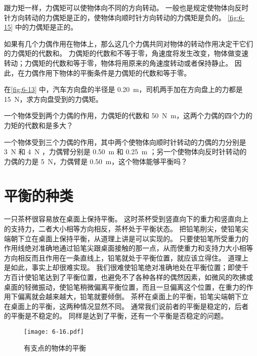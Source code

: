\medskip
跟力矩一样，力偶矩可以使物体向不同的方向转动。
一般也是规定使物体向反时针方向转动的力偶矩是正的，使物体向顺时针方向转动的力偶矩是负的。
\cref{fig:6-15} 中的力偶矩是正的。

如果有几个力偶作用在物体上，那么这几个力偶共同对物体的转动作用决定干它们的力偶矩的代数和。
力偶矩的代数和不等于零，角速度将发生改变，物体做变速转动；力偶矩的代数和等于零，物体将用原来的角速度转动或者保持静止。
因此，在力偶作用下物体的平衡条件是力偶矩的代数和等于零。

\begin{Practice}
\begin{question}
    \item 在\cref{fig:6-13} 中，汽车方向盘的半径是 \qty{0.20}{m}，司机两手加在方向盘上的力都是 \qty{15}{N}，求方向盘受到的力偶矩。
    \item 一个物体受到两个力偶的作用，力偶矩的代数和 \qty{50}{N.m}，这两个力偶的四个力的力矩的代数和是多大？
    \item 一个物体受到三个力偶的作用，其中两个使物体向顺时针转动的力偶的力分别是 \qty{3}{N} 和 \qty{4}{N} ，力偶臂分别是 \qty{0.50}{m} 和 \qty{0.25}{m} ；另一个使物体向反时针转动的力偶的力是 \qty{5}{N}，力偶臂是 \qty{0.50}{m}，这个物体能够平衡吗？
\end{question}
\end{Practice}

\section{平衡的种类}
一只茶杯很容易放在桌面上保持平衡。
这时茶杯受到竖直向下的重力和竖直向上的支持力，二者大小相等方向相反，茶杯处于平衡状态。
把铅笔削尖，使铅笔尖端朝下立在桌面上保持平衡，从道理上讲是可以实现的。
只要使铅笔所受重力的作用线绝对准确地通过铅笔尖跟桌面接触的那一点，从而使重力和支持力大小相等方向相反而且作用在一条直线上，铅笔就处于平衡位置，就应该立得住。
道理上是如此，事实上却很难实现。
我们很难使铅笔绝对准确地处在平衡位置；即使千方百计使铅笔达到了平衡位置，也避免不了各种各样的偶然因素，如微风的吹拂或桌面的轻微振动，使铅笔稍微偏离平衡位置，而且一旦偏离这个位置，在重力的作用下偏离就会越来越大，铅笔就要倾倒。
茶杯在桌面上的平衡，铅笔尖端朝下立在桌面上的平衡，这两种情况显然不同。
通常我们说前者的平衡是稳定的，后者的平衡是不稳定的。
同样是达到了平衡，还有一个平衡是否稳定的问题。
\begin{figure}
  \texttt{[image: 6-16.pdf]}
  \caption{有支点的物体的平衡}\label{fig:6-16}
\end{figure}

